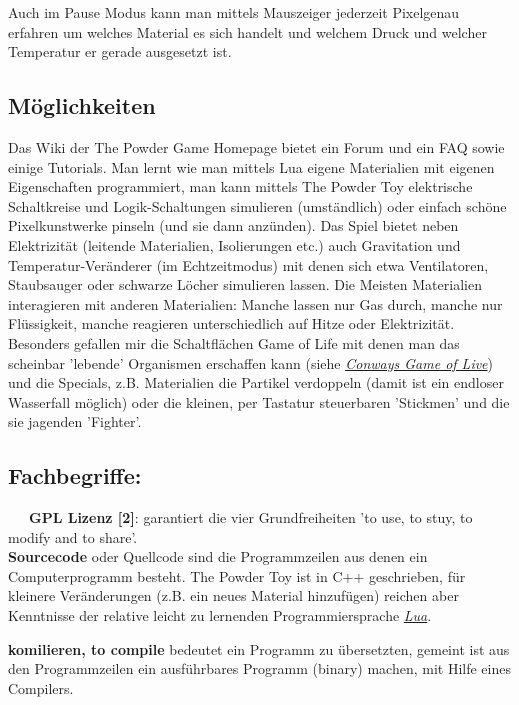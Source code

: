 \begin{multicols}{2}
\begin{center}
\end{center}
Auch im Pause Modus kann man mittels Mauszeiger jederzeit Pixelgenau erfahren um welches Material es sich handelt und welchem Druck und welcher Temperatur er gerade ausgesetzt ist. 

\subsection*{Möglichkeiten}

Das Wiki der The Powder Game Homepage bietet ein Forum und ein FAQ sowie einige Tutorials. Man lernt wie man mittels Lua eigene Materialien mit eigenen Eigenschaften programmiert, man kann mittels The Powder Toy elektrische Schaltkreise und Logik-Schaltungen simulieren (umständlich) oder einfach schöne Pixelkunstwerke pinseln (und sie dann anzünden). Das Spiel bietet neben Elektrizität (leitende Materialien, Isolierungen etc.) auch Gravitation und Temperatur-Veränderer (im Echtzeitmodus) mit denen sich etwa Ventilatoren, Staubsauger oder schwarze Löcher simulieren lassen. Die Meisten Materialien interagieren mit anderen Materialien: Manche lassen nur Gas durch, manche nur Flüssigkeit, manche reagieren unterschiedlich auf Hitze oder Elektrizität. Besonders gefallen mir die Schaltflächen Game of Life mit denen man das scheinbar 'lebende' Organismen erschaffen kann (siehe \href{https://de.wikipedia.org/wiki/Conways_Spiel_des_Lebens}{\textit{Conways Game of Live}}) und die Specials, z.B. Materialien die Partikel verdoppeln (damit ist ein endloser Wasserfall möglich) oder die kleinen, per Tastatur steuerbaren 'Stickmen' und die sie jagenden 'Fighter'. 

\subsection*{Fachbegriffe:}

~~~\textbf{GPL Lizenz [2]}: garantiert die vier Grundfreiheiten 'to use, to stuy, to modify and to share'. \\ 

\textbf{Sourcecode} oder Quellcode sind die Programmzeilen aus denen ein Computerprogramm besteht. The Powder Toy ist in C++ geschrieben, für kleinere Veränderungen (z.B. ein neues Material hinzufügen) reichen aber Kenntnisse der relative leicht zu lernenden Programmiersprache \href{https://de.wikipedia.org/wiki/Lua}{\textit{Lua}}.

\textbf{komilieren, to compile} bedeutet ein Programm zu übersetzten, gemeint ist aus den Programmzeilen ein ausführbares Programm (binary) machen, mit Hilfe eines Compilers. 


\end{multicols}
